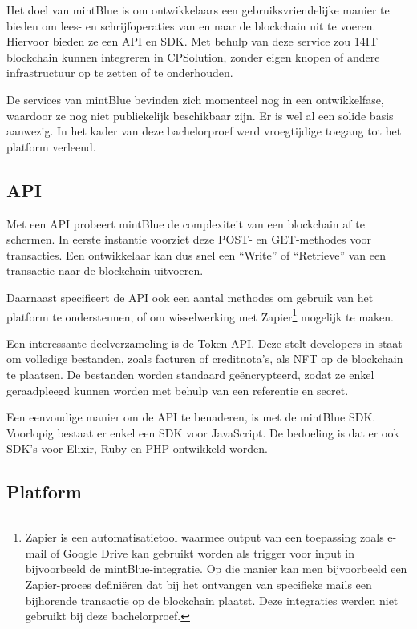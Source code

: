 Het doel van mintBlue is om ontwikkelaars een gebruiksvriendelijke manier te bieden om lees- en schrijfoperaties van en naar de blockchain uit te voeren. Hiervoor bieden ze een API en SDK. Met behulp van deze service zou 14IT blockchain kunnen integreren in CPSolution, zonder eigen knopen of andere infrastructuur op te zetten of te onderhouden.

De services van mintBlue bevinden zich momenteel nog in een ontwikkelfase, waardoor ze nog niet publiekelijk beschikbaar zijn. Er is wel al een solide basis aanwezig. In het kader van deze bachelorproef werd vroegtijdige toegang tot het platform verleend.

\subsection{API}
\label{sub:api}

Met een API probeert mintBlue de complexiteit van een blockchain af te schermen. In eerste instantie voorziet deze POST- en GET-methodes voor transacties. Een ontwikkelaar kan dus snel een ``Write'' of ``Retrieve'' van een transactie naar de blockchain uitvoeren.

Daarnaast specifieert de API ook een aantal methodes om gebruik van het platform te ondersteunen, of om wisselwerking met Zapier\footnote{Zapier is een automatisatietool waarmee output van een toepassing zoals e-mail of Google Drive kan gebruikt worden als trigger voor input in bijvoorbeeld de mintBlue-integratie. Op die manier kan men bijvoorbeeld een Zapier-proces definiëren dat bij het ontvangen van specifieke mails een bijhorende transactie op de blockchain plaatst. Deze integraties werden niet gebruikt bij deze bachelorproef.} mogelijk te maken.

Een interessante deelverzameling is de Token API. Deze stelt developers in staat om volledige bestanden, zoals facturen of creditnota's, als NFT op de blockchain te plaatsen. De bestanden worden standaard geëncrypteerd, zodat ze enkel geraadpleegd kunnen worden met behulp van een referentie en secret.

Een eenvoudige manier om de API te benaderen, is met de mintBlue SDK. Voorlopig bestaat er enkel een SDK voor JavaScript. De bedoeling is dat er ook SDK's voor Elixir, Ruby en PHP ontwikkeld worden.

\subsection{Platform}
\label{sub:platform}

